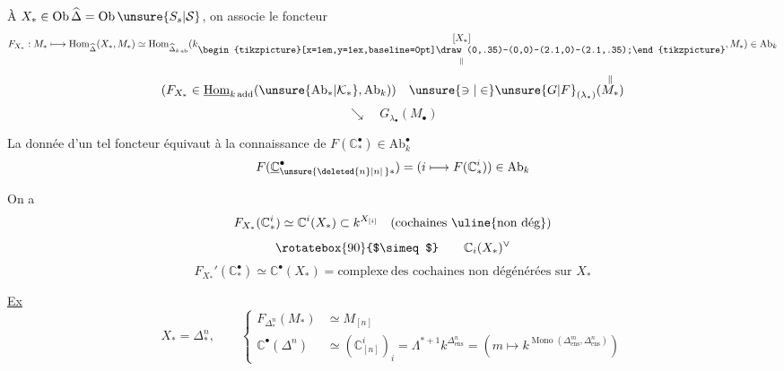 
À  $X_*\in\operatorname{Ob}\widehat\Delta=\operatorname{Ob}\unsure{S_s|\mathcal S}$,
on associe le foncteur
\[
F_{X_*}:M_*\longmapsto\operatorname{Hom}_{\widehat\Delta}(X_*,M_*)
\simeq\operatorname{Hom}_{\widehat\Delta_{k\,\text{ab}}}
(k\underset{\Vert}{\begin{gathered}[X_*]\\[-.7ex]\begin{tikzpicture}[x=1em,y=1ex,baseline=0pt]\draw (0,.35)--(0,0)--(2.1,0)--(2.1,.35);\end{tikzpicture}\end{gathered}},M_*)\in\mathrm{Ab}_k
\]
\[
(F_{X_*}\in\underline{\operatorname{Hom}}_{k\,\text{add}}(\unsure{\mathrm{Ab}_*|\mathcal K_*},\mathrm{Ab}_k))
\quad\unsure{\ni|\in}\unsure{G|F}_{(\lambda_*)}(\overset{\Vert}{M_*})
\]
\[
\searrow\quad G_{\lambda_\bullet}(M_\bullet)
\]

La donnée d'un tel foncteur 
équivaut à la connaissance de $F(\mathbb C_*^\bullet)\in\mathrm{Ab}_k^\bullet$
\[
F(\underline{\mathbb C}_{\unsure{\deleted{n}|n|\,}*}^\bullet)=(i\longmapsto F(\mathbb C_*^i))\in\mathrm{Ab}_k
\]

On a
\[
F_{X_*}(\mathbb C_*^i)\simeq\mathbb C^i(X_*)\subset k^{X_{[i]}}
\quad(\text{cochaines \uline{non dég}})
\]
\[
\rotatebox{90}{$\simeq$}\qquad\mathbb C_i(X_*)^\vee
\]
\[
F_{X_*}'(\mathbb C_*^\bullet)\simeq\mathbb C^\bullet(X_*)
=\text{complexe}\ \text{des cochaines non dégénérées sur }X_*
\]

\uline{Ex}
\[
X_* =\Delta_*^n,\qquad
\left\{\begin{aligned}
F_{\Delta_*^n}(M_*)&\simeq M_{[n]}\\
\mathbb C^\bullet(\Delta^n)&\simeq(\mathbb C_{[n]}^i)_i
=\Lambda^{*+1}k^{\Delta_{\mathrm{ens}}^n}
=(m\longmapsto k^{\operatorname{Mono}(\Delta_{\mathrm{ens}}^m,\Delta_{\mathrm{ens}}^n)})
\end{aligned}\right.
\]

